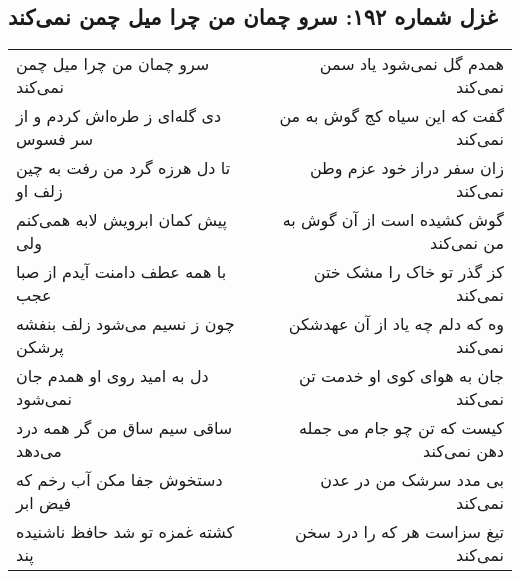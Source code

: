 \begin{center}
\section*{غزل شماره ۱۹۲: سرو چمان من چرا میل چمن نمی‌کند}
\label{sec:sh192}
\begin{longtable}{l p{0.5cm} r}
سرو چمان من چرا میل چمن نمی‌کند
&&
همدم گل نمی‌شود یاد سمن نمی‌کند
\\
دی گله‌ای ز طره‌اش کردم و از سر فسوس
&&
گفت که این سیاه کج گوش به من نمی‌کند
\\
تا دل هرزه گرد من رفت به چین زلف او
&&
زان سفر دراز خود عزم وطن نمی‌کند
\\
پیش کمان ابرویش لابه همی‌کنم ولی
&&
گوش کشیده است از آن گوش به من نمی‌کند
\\
با همه عطف  دامنت آیدم از صبا عجب
&&
کز گذر تو خاک را مشک ختن نمی‌کند
\\
چون ز نسیم می‌شود زلف بنفشه پرشکن
&&
وه که دلم چه یاد از آن عهدشکن نمی‌کند
\\
دل به امید روی او همدم جان نمی‌شود
&&
جان به هوای کوی او خدمت تن نمی‌کند
\\
ساقی سیم ساق من گر همه درد می‌دهد
&&
کیست که تن چو جام می جمله دهن نمی‌کند
\\
دستخوش جفا مکن آب رخم که فیض ابر
&&
بی مدد سرشک من در عدن نمی‌کند
\\
کشته غمزه تو شد حافظ ناشنیده پند
&&
تیغ سزاست هر که را درد سخن نمی‌کند
\\
\end{longtable}
\end{center}
